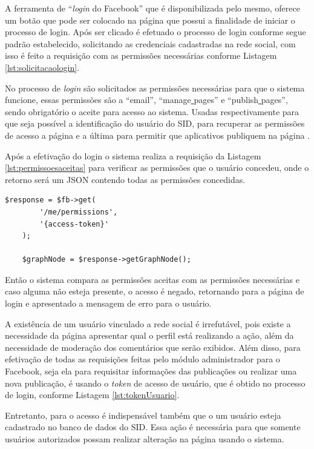 A ferramenta de ``\textit{login} do Facebook'' que é disponibilizada pelo mesmo, oferece um botão que pode ser colocado na página que possui a finalidade de iniciar o processo de login. Após ser clicado é efetuado o processo de login conforme segue padrão estabelecido, solicitando as credenciais cadastradas na rede social, com isso é feito a requisição com as permissões necessárias conforme Listagem \ref{lst:solicitacaologin}.

No processo de \textit{login} são solicitados as permissões necessárias para que o sistema funcione, essas permissões são a “email”, “manage\underline{{ }}pages” e “publish\underline{{ }}pages”, sendo obrigatório o aceite para acesso ao sistema. Usadas respectivamente para que seja possível a identificação do usuário do SID, para recuperar as permissões de acesso a página e a última para permitir que aplicativos publiquem na página \cite{facebook2018a}.

Após a efetivação do login o sistema realiza a requisição da Listagem \ref{lst:permissoesaceitas} para verificar as permissões que o usuário concedeu, onde o retorno será um JSON contendo todas as permissões concedidas.

\begin{lstlisting}[caption={Permissões concedidas},label={lst:permissoesaceitas}]
  	$response = $fb->get(
    	'/me/permissions',
		'{access-token}'
	);
	
	$graphNode = $response->getGraphNode();
\end{lstlisting}

Então o sistema compara as permissões aceitas com as permissões necessárias e caso alguma não esteja presente, o acesso é negado, retornando para a página de login e apresentado a mensagem de erro para o usuário.

A existência de um usuário vinculado a rede social é irrefutável, pois existe a necessidade da página apresentar qual o perfil está realizando a ação, além da necessidade de moderação dos comentários que serão exibidos.  Além disso, para efetivação de todas as requisições feitas pelo módulo administrador para o Facebook, seja ela para requisitar informações das publicações ou realizar uma nova publicação, é usando o \textit{token} de acesso de usuário, que é obtido no processo de login, conforme Listagem \ref{lst:tokenUsuario}.

Entretanto, para o acesso é indispensável também que o um usuário esteja cadastrado no banco de dados do SID. Essa ação é necessária para que somente usuários autorizados possam realizar alteração na página usando o sistema.

